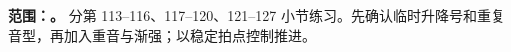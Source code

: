 \textbf{范围：\CurrentSegmentRange。} 分第 113--116、117--120、121--127 小节练习。先确认临时升降号和重复音型，再加入重音与渐强；以稳定拍点控制推进。
\SegmentScore
